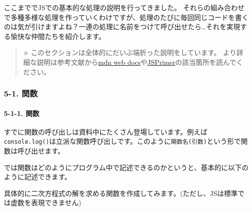 ここまででJSでの基本的な処理の説明を行ってきました。
それらの組み合わせで多種多様な処理を作っていくわけですが、処理のたびに毎回同じコードを書くのは気が引けますよね？一連の処理に名前をつけて呼び出せたら\ldots それを実現する愉快な仲間たちを紹介します。

\begin{quote}
※ このセクションは全体的にだいぶ端折った説明をしています。
より詳細な説明は参考文献から\href{https://developer.mozilla.org/ja/docs/Web}{mdn
web
docs}や\href{https://jsprimer.net/}{JSPrimer}の該当箇所を読んでください。
\end{quote}

\subsubsection{5-1. 関数}\label{ux95a2ux6570}

\paragraph{5-1-1. 関数}\label{ux95a2ux6570-1}

すでに関数の呼び出しは資料中にたくさん登場しています。例えば\texttt{console.log()}は立派な関数呼び出しです。このように\texttt{関数名(引数)}という形で関数は呼び出せます。

では関数はどのようにプログラム中で記述できるのかというと、基本的に以下のように記述できます。

\begin{Shaded}
\begin{Highlighting}[]
 \OperatorTok{\textless{}}\OperatorTok{\textgreater{}}\NormalTok{ (}\OperatorTok{\textless{}}\OperatorTok{\textgreater{}}\NormalTok{) \{}
  \OperatorTok{\textless{}}\OperatorTok{\textgreater{}}
   \OperatorTok{\textless{}}\OperatorTok{\textgreater{};}
\NormalTok{\}}
\end{Highlighting}
\end{Shaded}

具体的に二次方程式の解を求める関数を作成してみます。(ただし、JSは標準では虚数を表現できません)

